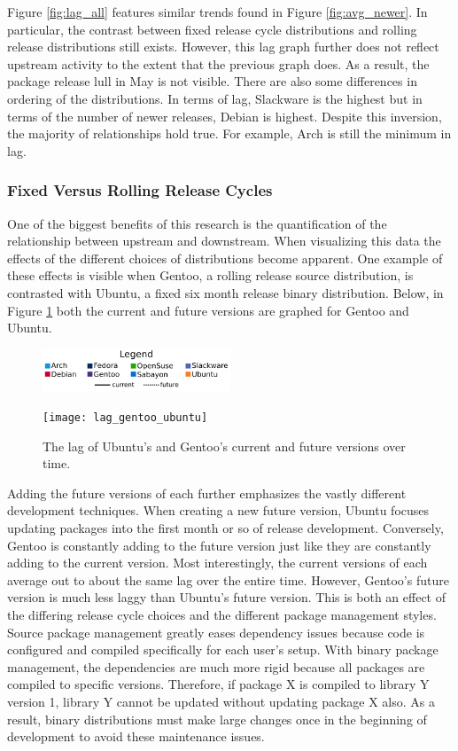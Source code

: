 \documentclass[letterpaper,10pt]{article}
\begin{document}
Figure \ref{fig:lag_all} features similar trends found in Figure \ref{fig:avg_newer}.  In particular, the contrast between fixed release cycle distributions and rolling release distributions still exists.  However, this lag graph further does not reflect upstream activity to the extent that the previous graph does.  As a result, the package release lull in May is not visible.  There are also some differences in ordering of the distributions.  In terms of lag, Slackware is the highest but in terms of the number of newer releases, Debian is highest.  Despite this inversion, the majority of relationships hold true.  For example, Arch is still the minimum in lag.
\subsubsection{Fixed Versus Rolling Release Cycles}
One of the biggest benefits of this research is the quantification of the relationship between upstream and downstream.  When visualizing this data the effects of the different choices of distributions become apparent.  One example of these effects is visible when Gentoo, a rolling release source distribution, is contrasted with Ubuntu, a fixed six month release binary distribution.  Below, in Figure \ref{fig:gu_lag} both the current and future versions are graphed for Gentoo and Ubuntu.

\begin{figure}[htb]
\begin{center}
\includegraphics[width=0.5\textwidth]{legend2}
\end{center}
\texttt{[image: lag\_gentoo\_ubuntu]}
\caption{The lag of Ubuntu's and Gentoo's current and future versions over time.}
\label{fig:gu_lag}
\end{figure}

Adding the future versions of each further emphasizes the vastly different development techniques.  When creating a new future version, Ubuntu focuses updating packages into the first month or so of release development.  Conversely, Gentoo is constantly adding to the future version just like they are constantly adding to the current version.  Most interestingly, the current versions of each average out to about the same lag over the entire time.  However, Gentoo's future version is much less laggy than Ubuntu's future version.  This is both an effect of the differing release cycle choices and the different package management styles.  Source package management greatly eases dependency issues because code is configured and compiled specifically for each user's setup.  With binary package management, the dependencies are much more rigid because all packages are compiled to specific versions.  Therefore, if package X is compiled to library Y version 1, library Y cannot be updated without updating package X also.  As a result, binary distributions must make large changes once in the beginning of development to avoid these maintenance issues.
\end{document}
